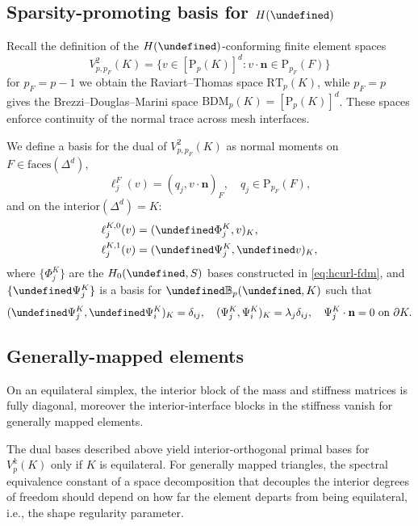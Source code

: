 \documentclass[review,onefignum,onetabnum,a4paper]{siamart190516}
\let\curl\undefined
\let\div\undefined
\DeclareMathOperator{\curl}{curl}
\DeclareMathOperator{\div}{div}
\newcommand{\Hdiv}{H(\div)}
\renewcommand{\vec}[1]{\mathbf{#1}}
\newcommand{\bn}{\vec{n}}
\renewcommand{\P}{\mathrm{P}}
\newcommand{\RT}{\mathrm{RT}}
\newcommand{\BDM}{\mathrm{BDM}}
\begin{document}
\subsection{Sparsity-promoting basis for $\Hdiv$}

Recall the definition of the $\Hdiv$-conforming finite element spaces
\begin{equation}
V^2_{p, p_F}(K) = \{v\in [\P_p(K)]^d : v\cdot\bn \in \P_{p_F}(F) \}
\end{equation}
for $p_F=p-1$ we obtain the Raviart--Thomas space $\RT_p(K)$, while
$p_F=p$ gives the Brezzi--Douglas--Marini space $\BDM_p(K) = [\P_p(K)]^d$. 
These spaces enforce continuity of the normal trace across mesh interfaces.

We define a basis for the dual of $V^2_{p, p_F}(K)$ as normal moments on $F\in
\text{faces}(\Delta^d)$,
\begin{equation}
   \ell^F_j(v) = (q_j, v\cdot \bn)_F, \quad q_j \in \P_{p_F}(F),
\end{equation}
and on the $\text{interior}(\Delta^d) = K$: 
\begin{align}
   \ell^{K,0}_j(v) &= (\curl\Phi^K_j, v)_{K}, \\
   \ell^{K,1}_j(v) &= (\div\Psi^K_j, \div v)_{K}, \label{eq:hdiv-interior-dofs}
\end{align}
where $\{\Phi^K_j\}$ are the $H_0(\curl, S)$ bases constructed in
\eqref{eq:hcurl-fdm}, and $\{\div\Psi^K_j\}$ is a basis for $\div
\mathbb{B}_p(\div, K)$ such that
\begin{equation} \label{eq:hdiv-fdm}
   (\div\Psi^K_j, \div\Psi^K_i)_K = \delta_{ij}, \quad
   (\Psi^K_j, \Psi^K_i)_{K} = \lambda_j\delta_{ij}, \quad
   \Psi^K_j\cdot\bn = 0 \text{ on }\partial K.
\end{equation}



\subsection{Generally-mapped elements}

On an equilateral simplex, the interior block of the mass and stiffness matrices
is fully diagonal, moreover the interior-interface blocks in the stiffness 
vanish for generally mapped elements.

The dual bases described above yield interior-orthogonal primal bases for $V^k_p(K)$ only
if $K$ is equilateral. For generally mapped triangles, the spectral equivalence constant of
a space decomposition that decouples the interior degrees of freedom should depend on how
far the element departs from being equilateral, i.e., the shape regularity parameter. 
\end{document}
